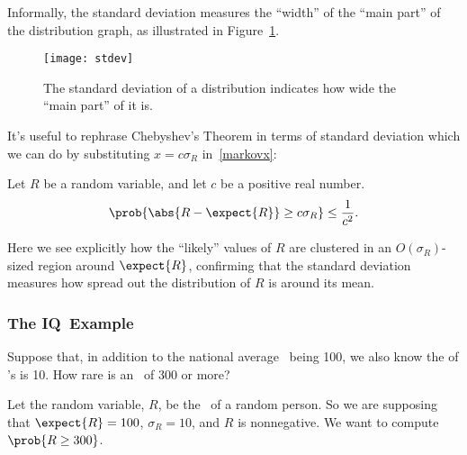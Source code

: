 Informally, the standard deviation measures the ``width'' of the ``main
part'' of the distribution graph, as illustrated in
Figure~\ref{fig:stdev}.
\begin{figure}
  \centerline{\texttt{[image: stdev]}}
  \caption{The standard deviation of a distribution indicates how wide the
    ``main part'' of it is.}
  \label{fig:stdev}
\end{figure}

It's useful to rephrase Chebyshev's Theorem in terms of standard
deviation which we can do by substituting $x = c \sigma_R$
in~\eqref{markovx}:
\begin{corollary}\label{cor:cheby}
Let $R$ be a random variable, and let $c$ be a positive real number.
\begin{equation}\label{markovcexp}
\prob{\abs{R - \expect{R}} \geq c \sigma_R} \leq \frac{1}{c^2}.
\end{equation}
\end{corollary}
Here we see explicitly how the ``likely'' values of $R$ are clustered in
an $O(\sigma_R)$-sized region around $\expect{R}$, confirming that the
standard deviation measures how spread out the distribution of $R$ is
around its mean.

\iffalse
\begin{proof}
  Substituting $x = c \sigma_R$ in~\eqref{markovx} gives:
  \begin{displaymath}
    \prob{\card{R - \expect{R}} \geq c \sigma_R}
    \leq
    \frac{\variance{R}}{(c \sigma_R)^2}
    =  \frac{\sigma_R^2}{(c \sigma_R)^2}
    = \frac{1}{c^2}.
  \end{displaymath}


\end{proof}

\fi

\subsubsection{The IQ\ Example}\label{IQsec}

Suppose that, in addition to the national average \idx{\IQ}\ being 100, we
also know the  of \IQ's is 10.  How rare is an
\IQ\ of 300 or more?

Let the random variable, $R$, be the \IQ\ of a random person.  So we are
supposing that $\expect{R} = 100$, $\sigma_R = 10$, and $R$ is
nonnegative.  We want to compute $\prob{R \geq 300}$.

